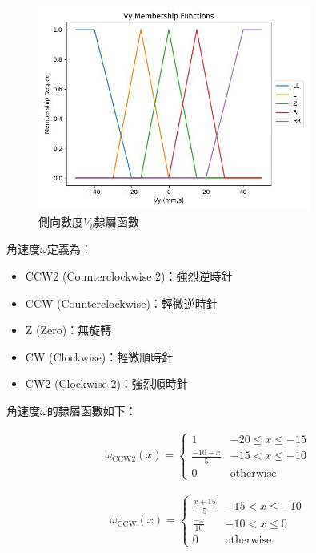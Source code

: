 \documentclass[12pt]{article}       %
\begin{document}
\begin{figure}[H]
    \centering
    \includegraphics[width=0.8\textwidth]{23.jpg}     %
    \caption{側向數度$V_{y}$隸屬函數}    %
    \label{fig:23}    %
\end{figure}

角速度$\omega$定義為：
\begin{itemize}
    \item CCW2 (Counterclockwise 2)：強烈逆時針
    \item CCW (Counterclockwise)：輕微逆時針
    \item Z (Zero)：無旋轉
    \item CW (Clockwise)：輕微順時針
    \item CW2 (Clockwise 2)：強烈順時針
\end{itemize}
角速度$\omega$的隸屬函數如下：

\begin{align}
    \omega_{\text{CCW2}}(x) = 
    \begin{cases}
    1 & -20 \le x \le -15 \\
    \frac{-10 - x}{5} & -15 < x \le -10 \\
    0 & \text{otherwise}
    \end{cases}    
\end{align}

\begin{align}
    \omega_{\text{CCW}}(x) = 
    \begin{cases}
    \frac{x + 15}{5} & -15 < x \le -10 \\
    \frac{-x}{10} & -10 < x \le 0 \\
    0 & \text{otherwise}
    \end{cases}     
\end{align}
\end{document}
